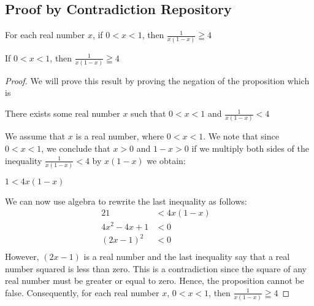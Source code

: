 \subsection*{Proof by Contradiction Repository}
\begin{example}
For each real number $x$, if $0 < x < 1$, then $\frac{1}{x(1-x)} \geqq 4$

\begin{tcolorbox}
	\begin{theorem}
	\label{the2}		
		If $0 < x < 1$, then $\frac{1}{x(1-x)} \geqq 4$
	\end{theorem}
\end{tcolorbox}

\begin{proof}

We will prove this result by proving the negation of the proposition which is
	\begin{center}
		There exists some real number $x$ such that $0 < x < 1$ and $\frac{1}{x(1-x)} < 4$
	\end{center}

We assume that $x$ is a real number, where $0 < x < 1$. We note that since $0 < x < 1$, we conclude that $x > 0$ and $1-x > 0$ if we multiply both sides of the inequality $\frac{1}{x(1-x)} < 4$ by $x(1-x)$ we obtain: 
	\begin{center}
		$1 < 4x(1-x)$
	\end{center}
We can now use algebra to rewrite the last inequality as follows: 
	\begin{alignat*}{2}
		1 				&< 4x(1-x)& \\
		4x^2 - 4x + 1 	&< 0& \\
		(2x - 1)^2 		&< 0& \\
	\end{alignat*} 
However, $(2x - 1)$ is a real number and the last inequality say that a real number squared is less than zero. This is a contradiction since the square of any real number must be greater or equal to zero. Hence, the proposition cannot be false. Consequently, for each real number $x$, $0 < x < 1$, then $\frac{1}{x(1-x)} \geqq 4$

\end{proof}
\end{example}


